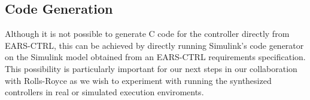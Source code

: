 \subsection{Code Generation}
\vspace{-.2cm}Although it is not possible to generate C code for the controller
directly from \textsf{EARS-CTRL}, this can be achieved by directly running Simulink's code
generator on the Simulink model obtained from an \textsf{EARS-CTRL} requirements
specification. This possibility is particularly important for our next steps in
our collaboration with Rolls-Royce as we wish to experiment with running the
synthesized controllers in real or simulated execution enviroments.
\vspace{-.5cm}
